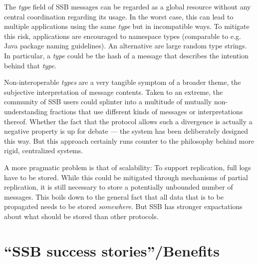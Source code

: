 \documentclass[sigconf]{acmart}
\begin{document}
The \textit{type} field of SSB messages can be regarded as a global resource without any central coordination regarding its usage. In the worst case, this can lead to multiple applications using the same \textit{type} but in incompatible ways. To mitigate this risk, applications are encouraged to namespace types (comparable to e.g. Java package naming guidelines). An alternative are large random type strings. In particular, a \textit{type} could be the hash of a message that describes the intention behind that \textit{type}.

Non-interoperable \textit{types} are a very tangible symptom of a broader theme, the subjective interpretation of message contents. Taken to an extreme, the community of SSB users could splinter into a multitude of mutually non-understanding fractions that use different kinds of messages or interpretations thereof. Whether the fact that the protocol allows such a divergence is actually a negative property is up for debate --- the system has been deliberately designed this way. But this approach certainly runs counter to the philosophy behind more rigid, centralized systems.

A more pragmatic problem is that of scalability: To support replication, full logs have to be stored. While this could be mitigated through mechanisms of partial replication, it is still necessary to store a potentially unbounded number of messages. This boils down to the general fact that all data that is to be propagated needs to be stored \textit{somewhere}. But SSB has stronger expactations about what should be stored than other protocols.


%

\section{``SSB success stories''/Benefits}
\end{document}
